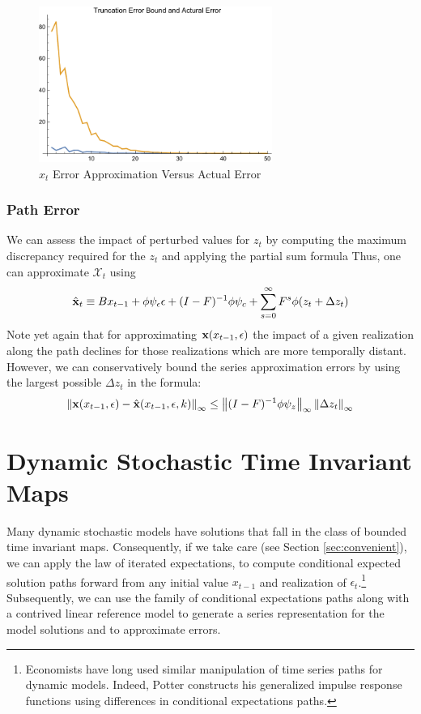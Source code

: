 \documentclass[12pt]{article}
\begin{document}
\begin{figure}
  \centering


\includegraphics[width=3in]{arbTruncErr.pdf}  
  \caption{$x_t$ Error Approximation Versus Actual Error} \label{figArbTrunc}

\end{figure}

\subsubsection{Path Error}


We can assess the impact of perturbed values for $z_t$ by computing the maximum discrepancy required for the $z_t$ and applying the 
partial sum formula
Thus, one can  approximate $\mathcal{X}_t$ using
 	 \begin{gather}
 	 \hat{\mathbf{x}}_t \equiv B x_{t-1}+ \phi \psi_\epsilon\epsilon  + (I - F)^{-1} \phi \psi_c + \sum_{s=0}^\infty F^s \phi (z_{t}+\Delta z_{t})\label{theDeltaSeries}
 \end{gather}
Note yet again that for approximating $\mathbf{x}(x_{t-1},\epsilon)$ the impact of  a given realization along the path declines for those realizations which are  more temporally distant.
However, we can conservatively bound the  series approximation  errors by using the largest possible $\Delta z_t$ in the formula:
    \begin{gather}
\left\lVert\mathbf{x}(x_{t-1},\epsilon)-\hat{\mathbf{x}}(x_{t-1},\epsilon,k)\right\rVert_\infty \le \left\lVert(I -F)^{-1} \phi \psi_z\right\rVert_\infty  \left\lVert\Delta z_t \right\rVert_\infty \label{pathErr}
    \end{gather}


\label{sec:pathnorm}

\section{Dynamic Stochastic Time Invariant Maps}
\label{sec:extToMaps}

Many dynamic stochastic models have solutions that 
fall in the class of bounded time invariant maps.
Consequently, if we take care (see Section \ref{sec:convenient}), we can apply the law of iterated expectations, 
to compute conditional expected solution paths 
forward from any initial value $x_{t-1}$
and realization of $\epsilon_t$.\footnote{Economists have long used similar manipulation of
time series paths for dynamic models. 
Indeed, Potter constructs his generalized impulse response functions using
differences in conditional expectations paths\cite{Potter2000,Koop1996a}.
}
Subsequently, we can use the family of conditional expectations paths 
along with a contrived linear reference model to generate
a series representation for the model solutions  and
to approximate errors.
\end{document}
